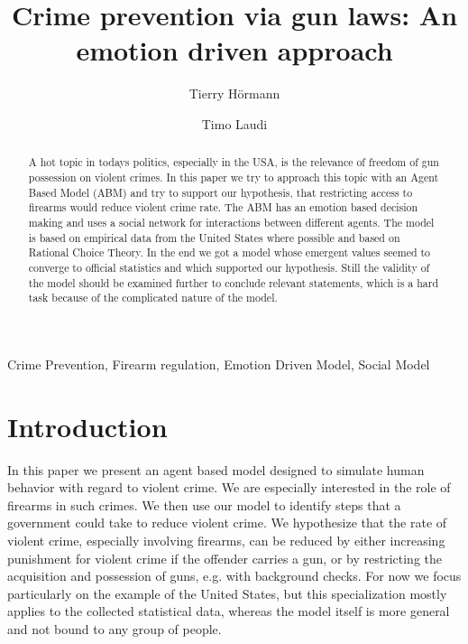 \documentclass{JASSS}
\title{Crime prevention via gun laws: An emotion driven approach}
\author[1]{Tierry H\"ormann}
\author[1]{Timo Laudi}
\affil[1]{ETH Z\"urich, Switzerland}
\begin{document}
\maketitle



\begin{abstract}
A hot topic in todays politics, especially in the USA, is the relevance of freedom of gun possession on violent crimes.
In this paper we try to approach this topic with an Agent Based Model (ABM) and try to support our hypothesis, that restricting access to firearms would reduce violent crime rate. The ABM has an emotion based decision making and uses a social network for interactions between different agents.
The model is based on empirical data from the United States where possible and based on Rational Choice Theory.
In the end we got a model whose emergent values seemed to converge to official statistics and which supported our hypothesis.
Still the validity of the model should be examined further to conclude relevant statements, which is a hard task because of the complicated nature of the model.
\end{abstract}

\begin{keywords}
Crime Prevention, Firearm regulation, Emotion Driven Model, Social Model
\end{keywords}

\parano{}


\section{Introduction}
In this paper we present an agent based model designed to simulate human behavior with regard to
violent crime. We are especially interested in the role of firearms in such crimes. We then use our
model to identify steps that a government could take to reduce violent crime. We hypothesize that
the rate of violent crime, especially involving firearms, can be reduced by either increasing
punishment for violent crime if the offender carries a gun, or by restricting the acquisition and
possession of guns, e.g. with background checks.
For now we focus
particularly on the example of the United States, but this specialization mostly applies to the
collected statistical data, whereas the model itself is more general and not bound to any group of
people.
\end{document}
